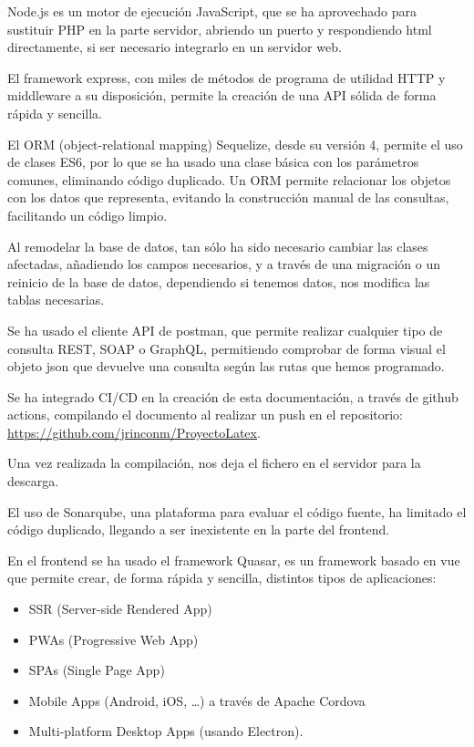 \documentclass[11pt,spanish,listoffigures,listoftables]{tfgetsinf}
\begin{document}
Node.js es un motor de ejecución JavaScript, que se ha aprovechado para sustituir PHP en la parte servidor, abriendo un puerto y respondiendo html directamente, si ser necesario integrarlo en un servidor web. 

El framework express, con miles de métodos de programa de utilidad HTTP y middleware a su disposición, permite la creación de una API sólida de forma rápida y sencilla.

El ORM (object-relational mapping) Sequelize, desde su versión 4, permite el uso de clases ES6, por lo que se ha usado una clase básica con los parámetros comunes, eliminando código duplicado. 
Un ORM permite relacionar los objetos con los datos que representa, evitando la construcción manual de las consultas, facilitando un código limpio.

Al remodelar la base de datos, tan sólo ha sido necesario cambiar las clases afectadas, añadiendo los campos necesarios, y a través de una migración o un reinicio de la base de datos, dependiendo si tenemos datos, nos modifica las tablas necesarias.

Se ha usado el cliente API de postman, que permite realizar cualquier tipo de consulta REST, SOAP o GraphQL, permitiendo comprobar de forma visual el objeto json que devuelve una consulta según las rutas que hemos programado.

Se ha integrado CI/CD en la creación de esta documentación, a través de github actions, compilando el documento al realizar un push en el repositorio:\\ \url{https://github.com/jrinconm/ProyectoLatex}. 

Una vez realizada la compilación, nos deja el fichero en el servidor para la descarga.

El uso de Sonarqube, una plataforma para evaluar el código fuente, ha limitado el código duplicado, llegando a ser inexistente en la parte del frontend.

En el frontend se ha usado el framework Quasar, es un framework basado en vue que permite crear, de forma rápida y sencilla, distintos tipos de aplicaciones:

\begin{itemize}
  \item SSR (Server-side Rendered App)
  \item PWAs (Progressive Web App)
  \item SPAs (Single Page App)
  \item Mobile Apps (Android, iOS, …) a través de Apache Cordova
  \item Multi-platform Desktop Apps (usando Electron).
\end{itemize}
\end{document}
